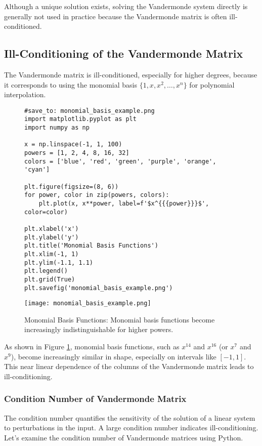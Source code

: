 \documentclass{article}
\begin{document}
Although a unique solution exists, solving the Vandermonde system directly is generally not used in practice because the Vandermonde matrix is often ill-conditioned.

\subsection{Ill-Conditioning of the Vandermonde Matrix}

The Vandermonde matrix is ill-conditioned, especially for higher degrees, because it corresponds to using the monomial basis $\{1, x, x^2, \dots, x^n\}$ for polynomial interpolation.

\begin{figure}[h]
    \centering
    \begin{verbatim}
#save_to: monomial_basis_example.png
import matplotlib.pyplot as plt
import numpy as np

x = np.linspace(-1, 1, 100)
powers = [1, 2, 4, 8, 16, 32]
colors = ['blue', 'red', 'green', 'purple', 'orange', 'cyan']

plt.figure(figsize=(8, 6))
for power, color in zip(powers, colors):
    plt.plot(x, x**power, label=f'$x^{{{power}}}$', color=color)

plt.xlabel('x')
plt.ylabel('y')
plt.title('Monomial Basis Functions')
plt.xlim(-1, 1)
plt.ylim(-1.1, 1.1)
plt.legend()
plt.grid(True)
plt.savefig('monomial_basis_example.png')
    \end{verbatim}
    \texttt{[image: monomial\_basis\_example.png]}
    \caption{Monomial Basis Functions: Monomial basis functions become increasingly indistinguishable for higher powers.}
    \label{fig:monomial_basis_example}
\end{figure}

As shown in Figure \ref{fig:monomial_basis_example}, monomial basis functions, such as $x^{14}$ and $x^{16}$ (or $x^7$ and $x^9$), become increasingly similar in shape, especially on intervals like $[-1, 1]$. This near linear dependence of the columns of the Vandermonde matrix leads to ill-conditioning.

\subsubsection{Condition Number of Vandermonde Matrix}

The condition number quantifies the sensitivity of the solution of a linear system to perturbations in the input. A large condition number indicates ill-conditioning. Let's examine the condition number of Vandermonde matrices using Python.
\end{document}
